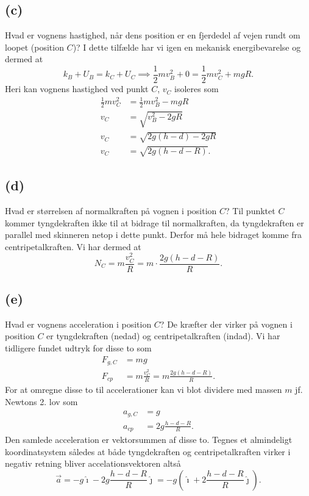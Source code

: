 \documentclass[12pt]{article}
\theoremstyle{definition}
\begin{document}
\subsection*{(c)}
Hvad er vognens hastighed, når dens position er en fjerdedel af vejen rundt om loopet (position $C$)?
\bigbreak
I dette tilfælde har vi igen en mekanisk energibevarelse og dermed at
\[ 
k_{B} + U_{B} = k_{C} + U_{C} \implies \frac{1}{2}mv_B^2 + 0 = \frac{1}{2}mv_C^2 + mgR
.\]
Heri kan vognens hastighed ved punkt $C$, $v_C$ isoleres som
\begin{align*}
  \frac{1}{2}mv_C^2 &= \frac{1}{2}mv_B^2 - mgR \\
  v_C &= \sqrt{v_B^2 - 2gR} \\
  v_C &= \sqrt{2g(h-d) - 2gR} \\
  v_C &= \sqrt{2g(h-d-R)}
.\end{align*}

\subsection*{(d)}
Hvad er størrelsen af normalkraften på vognen i position $C$?
\bigbreak
Til punktet $C$ kommer tyngdekraften ikke til at bidrage til normalkraften, da tyngdekraften er parallel med skinneren netop i dette punkt. Derfor må hele bidraget komme fra centripetalkraften. Vi har dermed at
\[ 
N_C = m \frac{v_C^2}{R} = m \cdot \frac{2g(h-d-R)}{R}
.\]



\subsection*{(e)}
Hvad er vognens acceleration i position $C$?
\bigbreak
De kræfter der virker på vognen i position $C$ er tyngdekraften (nedad) og centripetalkraften (indad). Vi har tidligere fundet udtryk for disse to som
\begin{align*}
  F_{g,C} &= mg \\
  F_{cp} &= m \frac{v_C^2}{R} = m \frac{2g(h-d-R)}{R}
.\end{align*}
For at omregne disse to til accelerationer kan vi blot dividere med massen $m$ jf. Newtons 2. lov som
\begin{align*}
  a_{g,C} &= g \\
  a_{cp} &= 2g\frac{h-d-R}{R}
.\end{align*}
Den samlede acceleration er vektorsummen af disse to. Tegnes et almindeligt koordinatsystem således at både tyngdekraften og centripetalkraften virker i negativ retning bliver accelationsvektoren altså
\[ 
\Vec{a} = -g \hat{\imath} - 2g \frac{h-d-R}{R} \hat{\jmath} = -g \left( \hat{\imath} + 2 \frac{h-d-R}{R} \hat{\jmath} \right)
.\]
\end{document}
